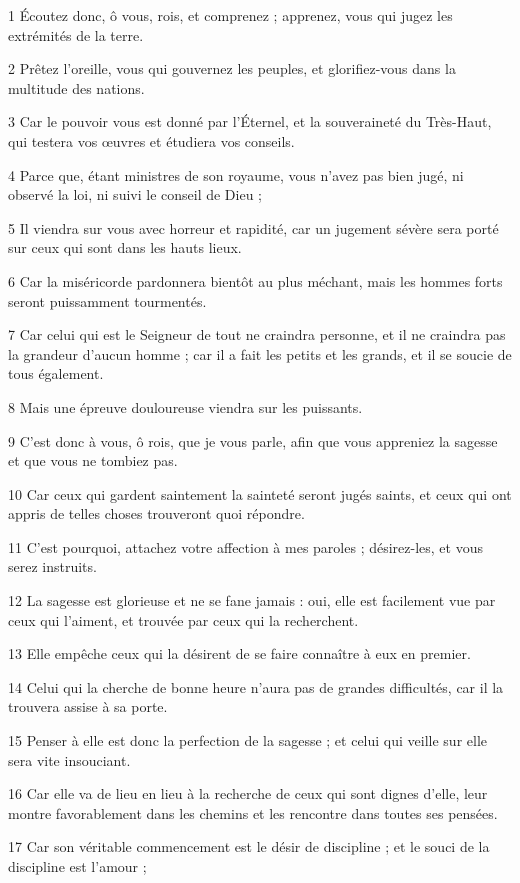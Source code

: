 \par 1 Écoutez donc, ô vous, rois, et comprenez ; apprenez, vous qui jugez les extrémités de la terre.
\par 2 Prêtez l'oreille, vous qui gouvernez les peuples, et glorifiez-vous dans la multitude des nations.
\par 3 Car le pouvoir vous est donné par l'Éternel, et la souveraineté du Très-Haut, qui testera vos œuvres et étudiera vos conseils.
\par 4 Parce que, étant ministres de son royaume, vous n'avez pas bien jugé, ni observé la loi, ni suivi le conseil de Dieu ;
\par 5 Il viendra sur vous avec horreur et rapidité, car un jugement sévère sera porté sur ceux qui sont dans les hauts lieux.
\par 6 Car la miséricorde pardonnera bientôt au plus méchant, mais les hommes forts seront puissamment tourmentés.
\par 7 Car celui qui est le Seigneur de tout ne craindra personne, et il ne craindra pas la grandeur d'aucun homme ; car il a fait les petits et les grands, et il se soucie de tous également.
\par 8 Mais une épreuve douloureuse viendra sur les puissants.
\par 9 C'est donc à vous, ô rois, que je vous parle, afin que vous appreniez la sagesse et que vous ne tombiez pas.
\par 10 Car ceux qui gardent saintement la sainteté seront jugés saints, et ceux qui ont appris de telles choses trouveront quoi répondre.
\par 11 C'est pourquoi, attachez votre affection à mes paroles ; désirez-les, et vous serez instruits.
\par 12 La sagesse est glorieuse et ne se fane jamais : oui, elle est facilement vue par ceux qui l'aiment, et trouvée par ceux qui la recherchent.
\par 13 Elle empêche ceux qui la désirent de se faire connaître à eux en premier.
\par 14 Celui qui la cherche de bonne heure n'aura pas de grandes difficultés, car il la trouvera assise à sa porte.
\par 15 Penser à elle est donc la perfection de la sagesse ; et celui qui veille sur elle sera vite insouciant.
\par 16 Car elle va de lieu en lieu à la recherche de ceux qui sont dignes d'elle, leur montre favorablement dans les chemins et les rencontre dans toutes ses pensées.
\par 17 Car son véritable commencement est le désir de discipline ; et le souci de la discipline est l'amour ;
